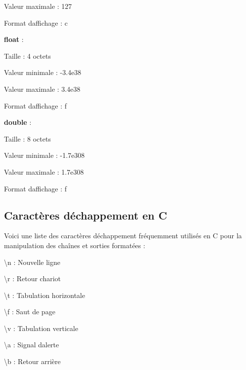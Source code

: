 \begin{DoxyItemize}
\begin{DoxyItemize}
\item Valeur maximale \+: 127
\item Format d\textquotesingle{}affichage \+: {\ttfamily c}
\end{DoxyItemize}
\item {\bfseries float} \+:
\begin{DoxyItemize}
\item Taille \+: 4 octets
\item Valeur minimale \+: -\/3.\+4e38
\item Valeur maximale \+: 3.\+4e38
\item Format d\textquotesingle{}affichage \+: {\ttfamily f}
\end{DoxyItemize}
\item {\bfseries double} \+:
\begin{DoxyItemize}
\item Taille \+: 8 octets
\item Valeur minimale \+: -\/1.\+7e308
\item Valeur maximale \+: 1.\+7e308
\item Format d\textquotesingle{}affichage \+: {\ttfamily f}
\end{DoxyItemize}
\end{DoxyItemize}

\subsection*{Caractères d\textquotesingle{}échappement en C}

Voici une liste des caractères d\textquotesingle{}échappement fréquemment utilisés en C pour la manipulation des chaînes et sorties formatées \+:


\begin{DoxyItemize}
\item {\ttfamily \textbackslash{}n} \+: Nouvelle ligne
\item {\ttfamily \textbackslash{}r} \+: Retour chariot
\item {\ttfamily \textbackslash{}t} \+: Tabulation horizontale
\item {\ttfamily \textbackslash{}f} \+: Saut de page
\item {\ttfamily \textbackslash{}v} \+: Tabulation verticale
\item {\ttfamily \textbackslash{}a} \+: Signal d\textquotesingle{}alerte
\item {\ttfamily \textbackslash{}b} \+: Retour arrière
\end{DoxyItemize}

